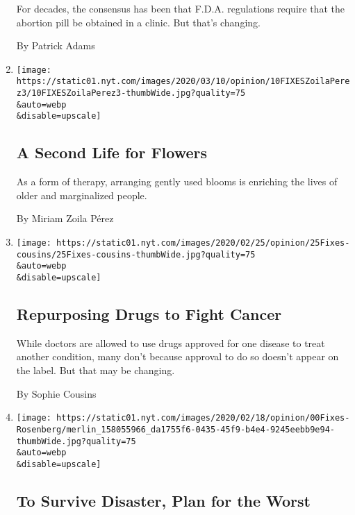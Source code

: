\begin{enumerate}
  For decades, the consensus has been that F.D.A. regulations require
  that the abortion pill be obtained in a clinic. But that's changing.

  By Patrick Adams
\item
  \href{/2020/03/10/opinion/second-life-flowers.html}{}

  \texttt{[image: https://static01.nyt.com/images/2020/03/10/opinion/10FIXESZoilaPerez3/10FIXESZoilaPerez3-thumbWide.jpg?quality=75\\\&auto=webp\\\&disable=upscale]}

  \hypertarget{a-second-life-for-flowers}{%
  \subsection{A Second Life for
  Flowers}\label{a-second-life-for-flowers}}

  As a form of therapy, arranging gently used blooms is enriching the
  lives of older and marginalized people.

  By Miriam Zoila Pérez
\item
  \href{/2020/02/25/opinion/repurposing-drugs-cancer.html}{}

  \texttt{[image: https://static01.nyt.com/images/2020/02/25/opinion/25Fixes-cousins/25Fixes-cousins-thumbWide.jpg?quality=75\\\&auto=webp\\\&disable=upscale]}

  \hypertarget{repurposing-drugs-to-fight-cancer}{%
  \subsection{Repurposing Drugs to Fight
  Cancer}\label{repurposing-drugs-to-fight-cancer}}

  While doctors are allowed to use drugs approved for one disease to
  treat another condition, many don't because approval to do so doesn't
  appear on the label. But that may be changing.

  By Sophie Cousins
\item
  \href{/2020/02/19/opinion/survive-disaster-plan-for-worst.html}{}

  \texttt{[image: https://static01.nyt.com/images/2020/02/18/opinion/00Fixes-Rosenberg/merlin\_158055966\_da1755f6-0435-45f9-b4e4-9245eebb9e94-thumbWide.jpg?quality=75\\\&auto=webp\\\&disable=upscale]}

  \hypertarget{to-survive-disaster-plan-for-the-worst}{%
  \subsection{To Survive Disaster, Plan for the
  Worst}\label{to-survive-disaster-plan-for-the-worst}}


\end{enumerate}
